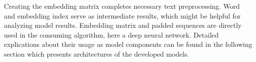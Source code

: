 Creating the embedding matrix completes necessary text preprocessing.
Word and embedding index serve as intermediate results, which might be helpful
for analyzing model results.
Embedding matrix and padded sequences are directly used in the consuming
algorithm, here a deep neural network.
Detailed explications about their usage as model components can be found in the
following section which presents architectures of the developed models.
